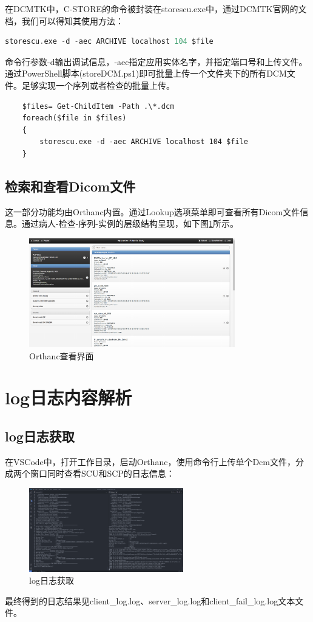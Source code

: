 \documentclass[UTF8]{ctexart}
\begin{document}
在DCMTK中，C-STORE的命令被封装在storescu.exe中，通过DCMTK官网的文档，我们可以得知其使用方法\cite{DCMTK}：
\begin{lstlisting}[language=C]
    storescu.exe -d -aec ARCHIVE localhost 104 $file
\end{lstlisting}
命令行参数-d输出调试信息，-aec指定应用实体名字，并指定端口号和上传文件。通过PowerShell脚本(storeDCM.ps1)即可批量上传一个文件夹下的所有DCM文件。足够实现一个序列或者检查的批量上传。
\begin{lstlisting}
    $files= Get-ChildItem -Path .\*.dcm 
    foreach($file in $files)
    {
        storescu.exe -d -aec ARCHIVE localhost 104 $file
    }
\end{lstlisting}

\subsection{检索和查看Dicom文件}
这一部分功能均由Orthanc内置。通过Lookup选项菜单即可查看所有Dicom文件信息。通过病人-检查-序列-实例的层级结构呈现，如下图\ref{fig:Orthanc Lookup}所示。
\begin{figure}[H]
    \centering
    \includegraphics[width=0.8\textwidth]{lookup.png}
    \caption{Orthanc查看界面}
    \label{fig:Orthanc Lookup}
\end{figure}

\section{log日志内容解析}
\subsection{log日志获取}
在VSCode中，打开工作目录，启动Orthanc，使用命令行上传单个Dcm文件，分成两个窗口同时查看SCU和SCP的日志信息\cite{DICOM}：
\begin{figure}[H]
    \centering
    \includegraphics[width=0.6\textwidth]{running.png}
    \caption{log日志获取}
    \label{fig:get log}
\end{figure}
最终得到的日志结果见client\_log.log、server\_log.log和client\_fail\_log.log文本文件。
\end{document}
